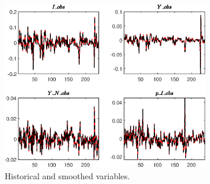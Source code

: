  
\begin{figure}[H]
\centering 
\includegraphics[width=0.80\textwidth]{BRS_growth_sep/graphs/BRS_growth_sep_HistoricalAndSmoothedVariables1}
\caption{Historical and smoothed variables.}\label{Fig:HistoricalAndSmoothedVariables:1}
\end{figure}



